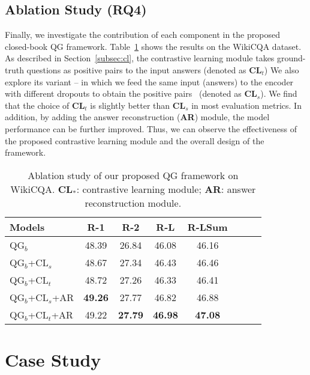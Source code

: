 \documentclass[11pt]{article}
\begin{document}
\subsection{Ablation Study (RQ4)}
Finally, we investigate the contribution of each component in the proposed closed-book QG framework. Table~\ref{tab:ablation-results} shows the results on the WikiCQA dataset. As described in Section~\ref{subsec:cl}, the  contrastive learning module takes ground-truth questions as positive pairs to the input answers (denoted as \textbf{CL}$_{t}$)
We also explore its variant -- in which we feed the same input (answers) to the encoder with different dropouts to obtain the positive pairs~\cite{gao-etal-2021-simcse} (denoted as \textbf{CL}$_{s}$). We find that the choice of \textbf{CL}$_{t}$ is slightly better than \textbf{CL}$_{s}$ in most evaluation metrics. In addition, by adding the answer reconstruction (\textbf{AR}) module, the model performance can be further improved. Thus, we can observe the effectiveness of the proposed contrastive learning module and the overall design of the framework.

\begin{table}[htbp!]
\centering\small
\begin{tabular}{lccccccc}
\hline
\textbf{Models} & \textbf{R-1} & \textbf{R-2} & \textbf{R-L} & \textbf{R-LSum}\\
\hline
QG$_{b}$ & 48.39 & 26.84 & 46.08 & 46.16  \\
QG$_{b}$+CL$_{s}$ & 48.67 & 27.34 & 46.43 & 46.46 \\
QG$_{b}$+CL$_{t}$ & 48.72 & 27.26 & 46.33 & 46.41 \\
QG$_{b}$+CL$_{s}$+AR & \textbf{49.26} & 27.77 & 46.82 & 46.88 \\
QG$_{b}$+CL$_{t}$+AR & 49.22 & \textbf{27.79} & \textbf{46.98} & \textbf{47.08} \\
\hline
\end{tabular}
\caption{Ablation study of our proposed QG framework on WikiCQA. \textbf{CL}$_*$: contrastive learning module; \textbf{AR}: answer reconstruction module.}
\label{tab:ablation-results}
\end{table}
\vspace{-0.5cm}







\section{Case Study}
\end{document}
